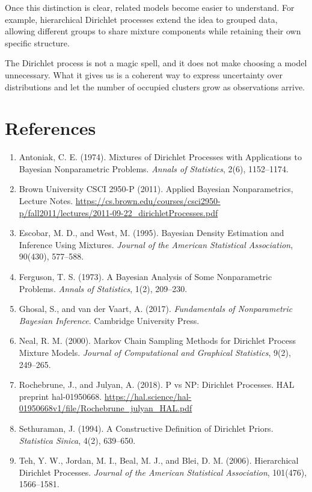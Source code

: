 \documentclass[11pt]{article}
\begin{document}
Once this distinction is clear, related models become easier to understand. For example, hierarchical Dirichlet processes extend the idea to grouped data, allowing different groups to share mixture components while retaining their own specific structure.

The Dirichlet process is not a magic spell, and it does not make choosing a model unnecessary. What it gives us is a coherent way to express uncertainty over distributions and let the number of occupied clusters grow as observations arrive. 

\section*{References}

\begin{enumerate}[leftmargin=*]
  \item Antoniak, C. E. (1974). Mixtures of Dirichlet Processes with Applications to Bayesian Nonparametric Problems. \emph{Annals of Statistics}, 2(6), 1152--1174.
  \item Brown University CSCI 2950-P (2011). Applied Bayesian Nonparametrics, Lecture Notes. \url{https://cs.brown.edu/courses/csci2950-p/fall2011/lectures/2011-09-22_dirichletProcesses.pdf}
  \item Escobar, M. D., and West, M. (1995). Bayesian Density Estimation and Inference Using Mixtures. \emph{Journal of the American Statistical Association}, 90(430), 577--588.
  \item Ferguson, T. S. (1973). A Bayesian Analysis of Some Nonparametric Problems. \emph{Annals of Statistics}, 1(2), 209--230.
  \item Ghosal, S., and van der Vaart, A. (2017). \emph{Fundamentals of Nonparametric Bayesian Inference}. Cambridge University Press.
  \item Neal, R. M. (2000). Markov Chain Sampling Methods for Dirichlet Process Mixture Models. \emph{Journal of Computational and Graphical Statistics}, 9(2), 249--265.
  \item Rochebrune, J., and Julyan, A. (2018). P vs NP: Dirichlet Processes. HAL preprint hal-01950668. \url{https://hal.science/hal-01950668v1/file/Rochebrune_julyan_HAL.pdf}
  \item Sethuraman, J. (1994). A Constructive Definition of Dirichlet Priors. \emph{Statistica Sinica}, 4(2), 639--650.
  \item Teh, Y. W., Jordan, M. I., Beal, M. J., and Blei, D. M. (2006). Hierarchical Dirichlet Processes. \emph{Journal of the American Statistical Association}, 101(476), 1566--1581.
\end{enumerate}
\end{document}
